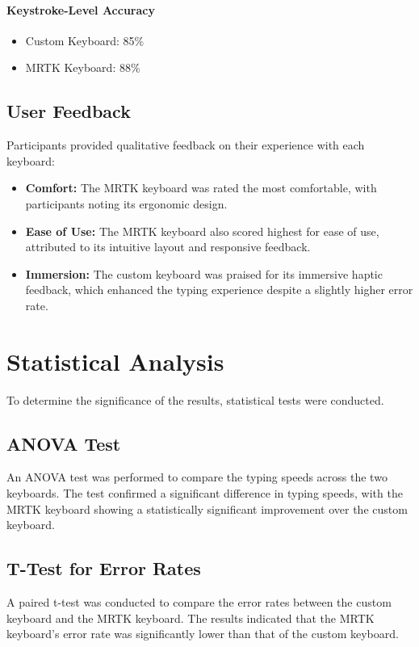 \paragraph{Keystroke-Level Accuracy}
\begin{itemize}
    \item Custom Keyboard: 85\%
    \item MRTK Keyboard: 88\%
\end{itemize}

\subsection{User Feedback}
Participants provided qualitative feedback on their experience with each keyboard:
\begin{itemize}
    \item \textbf{Comfort:} The MRTK keyboard was rated the most comfortable, with participants noting its ergonomic design.
    \item \textbf{Ease of Use:} The MRTK keyboard also scored highest for ease of use, attributed to its intuitive layout and responsive feedback.
    \item \textbf{Immersion:} The custom keyboard was praised for its immersive haptic feedback, which enhanced the typing experience despite a slightly higher error rate.
\end{itemize}

\section{Statistical Analysis}
To determine the significance of the results, statistical tests were conducted.

\subsection{ANOVA Test}
An ANOVA test was performed to compare the typing speeds across the two keyboards. The test confirmed a significant difference in typing speeds, with the MRTK keyboard showing a statistically significant improvement over the custom keyboard.

\subsection{T-Test for Error Rates}
A paired t-test was conducted to compare the error rates between the custom keyboard and the MRTK keyboard. The results indicated that the MRTK keyboard's error rate was significantly lower than that of the custom keyboard.

